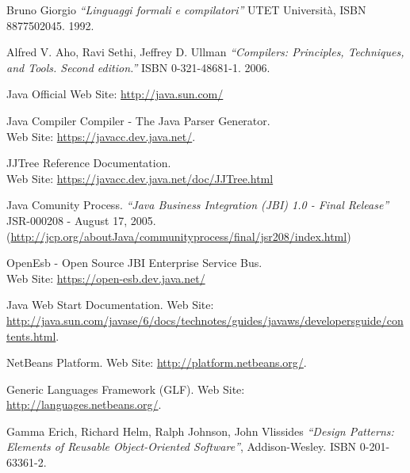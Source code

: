 \begin{thebibliography}{99}
 Bruno Giorgio \emph{``Linguaggi formali e compilatori''} 
UTET Università, ISBN 8877502045. 1992.

 Alfred V. Aho, Ravi Sethi, Jeffrey D. Ullman
\emph{``Compilers: Principles, Techniques, and Tools. Second edition.''} ISBN
0-321-48681-1. 2006.

 Java Official Web
Site: \href{http://java.sun.com/}{http://java.sun.com/}

 Java Compiler Compiler - The Java Parser
Generator. \\
Web Site: \href{https://javacc.dev.java.net/}{https://javacc.dev.java.net/}.

 JJTree Reference Documentation. \\
Web Site:
\href{https://javacc.dev.java.net/doc/JJTree.html}{https://javacc.dev.java.net/doc/JJTree.html}

 Java Comunity Process. \emph{``Java Business Integration (JBI)
1.0 - Final Release''} JSR-000208 - August 17, 2005. \\
(\href{http://jcp.org/aboutJava/communityprocess/final/jsr208/index.html}{http://jcp.org/aboutJava/communityprocess/final/jsr208/index.html})

 OpenEsb - Open Source JBI Enterprise Service Bus. \\
Web Site: \href{https://open-esb.dev.java.net/}{https://open-esb.dev.java.net/}

 Java Web Start Documentation. Web Site: \\
\href{http://java.sun.com/javase/6/docs/technotes/guides/javaws/developersguide/contents.html}{http://java.sun.com/javase/6/docs/technotes/guides/javaws/developersguide/contents.html}.

 NetBeans Platform. Web Site:
\href{http://platform.netbeans.org/}{http://platform.netbeans.org/}.


 Generic Languages Framework (GLF). Web Site: \\
\href{http://languages.netbeans.org/}{http://languages.netbeans.org/}.

 Gamma Erich, Richard Helm, Ralph Johnson, John Vlissides
\emph{``Design Patterns: Elements of Reusable Object-Oriented Software''},
Addison-Wesley. ISBN 0-201-63361-2.


\end{thebibliography}
